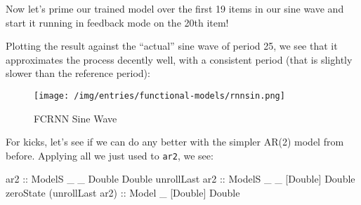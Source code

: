 \documentclass[]{article}
\newenvironment{Shaded}{}{}
\newcommand{\CommentTok}[1]{\textcolor[rgb]{0.38,0.63,0.69}{\textit{#1}}}
\newcommand{\DataTypeTok}[1]{\textcolor[rgb]{0.56,0.13,0.00}{#1}}
\newcommand{\DecValTok}[1]{\textcolor[rgb]{0.25,0.63,0.44}{#1}}
\newcommand{\FloatTok}[1]{\textcolor[rgb]{0.25,0.63,0.44}{#1}}
\newcommand{\FunctionTok}[1]{\textcolor[rgb]{0.02,0.16,0.49}{#1}}
\newcommand{\KeywordTok}[1]{\textcolor[rgb]{0.00,0.44,0.13}{\textbf{#1}}}
\newcommand{\NormalTok}[1]{#1}
\newcommand{\OperatorTok}[1]{\textcolor[rgb]{0.40,0.40,0.40}{#1}}
\newcommand{\OtherTok}[1]{\textcolor[rgb]{0.00,0.44,0.13}{#1}}
\begin{document}
Now let's prime our trained model over the first 19 items in our sine wave and
start it running in feedback mode on the 20th item!

\begin{Shaded}
\end{Shaded}

Plotting the result against the ``actual'' sine wave of period 25, we see that
it approximates the process decently well, with a consistent period (that is
slightly slower than the reference period):

\begin{figure}
\centering
\texttt{[image: /img/entries/functional-models/rnnsin.png]}
\caption{FCRNN Sine Wave}
\end{figure}

For kicks, let's see if we can do any better with the simpler AR(2) model from
before. Applying all we just used to \texttt{ar2}, we see:

\begin{Shaded}
\begin{Highlighting}[]
\OtherTok{ar2                        ::} \DataTypeTok{ModelS}\NormalTok{ \_ \_  }\DataTypeTok{Double}  \DataTypeTok{Double}
\NormalTok{unrollLast}\OtherTok{ ar2             ::} \DataTypeTok{ModelS}\NormalTok{ \_ \_ [}\DataTypeTok{Double}\NormalTok{] }\DataTypeTok{Double}
\NormalTok{zeroState (unrollLast ar2)}\OtherTok{ ::} \DataTypeTok{Model}\NormalTok{  \_   [}\DataTypeTok{Double}\NormalTok{] }\DataTypeTok{Double}
\end{Highlighting}
\end{Shaded}
\end{document}
